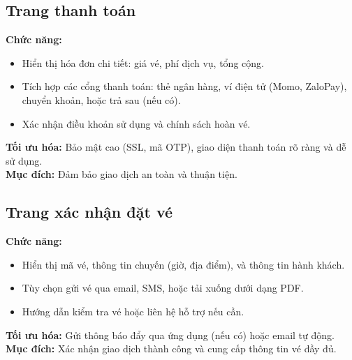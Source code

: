 \subsection*{Trang thanh toán}
\textbf{Chức năng:}
\begin{itemize}
    \item Hiển thị hóa đơn chi tiết: giá vé, phí dịch vụ, tổng cộng.
    \item Tích hợp các cổng thanh toán: thẻ ngân hàng, ví điện tử (Momo, ZaloPay), chuyển khoản, hoặc trả sau (nếu có).
    \item Xác nhận điều khoản sử dụng và chính sách hoàn vé.
\end{itemize}
\textbf{Tối ưu hóa:} Bảo mật cao (SSL, mã OTP), giao diện thanh toán rõ ràng và dễ sử dụng.\\
\textbf{Mục đích:} Đảm bảo giao dịch an toàn và thuận tiện.

\subsection*{Trang xác nhận đặt vé}
\textbf{Chức năng:}
\begin{itemize}
    \item Hiển thị mã vé, thông tin chuyến (giờ, địa điểm), và thông tin hành khách.
    \item Tùy chọn gửi vé qua email, SMS, hoặc tải xuống dưới dạng PDF.
    \item Hướng dẫn kiểm tra vé hoặc liên hệ hỗ trợ nếu cần.
\end{itemize}
\textbf{Tối ưu hóa:} Gửi thông báo đẩy qua ứng dụng (nếu có) hoặc email tự động.\\
\textbf{Mục đích:} Xác nhận giao dịch thành công và cung cấp thông tin vé đầy đủ.


